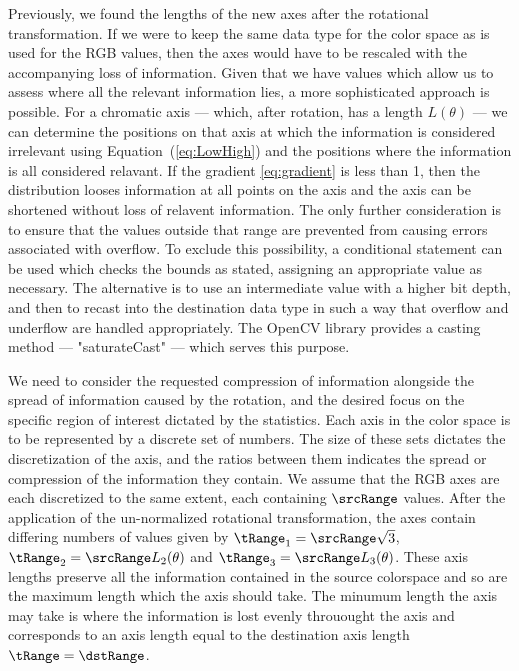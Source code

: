 Previously, we found the lengths of the new axes after the rotational transformation. If we were to keep the same data type for the color space as is used for the RGB values, then the axes would have to be rescaled with the accompanying loss of information. Given that we have values which allow us to assess where all the relevant information lies, a more sophisticated approach is possible. For a chromatic axis --- which, after rotation, has a length $L(\theta)$ --- we can determine the positions on that axis at which the information is considered irrelevant using Equation~(\ref{eq:LowHigh}) and the positions where the information is all considered relavant. If the gradient \ref{eq:gradient} is less than 1, then the distribution looses information at all points on the axis and the axis can be shortened without loss of relavent information. The only further consideration is to ensure that the values outside that range are prevented from causing errors associated with overflow. To exclude this possibility, a conditional statement can be used which checks the bounds as stated, assigning an appropriate value as necessary. The alternative is to use an intermediate value with a higher bit depth, and then to recast into the destination data type in such a way that overflow and underflow are handled appropriately. The OpenCV library provides a casting method --- "saturateCast" --- which serves this purpose.

We need to consider the requested compression of information alongside the spread of information caused by the rotation, and the desired focus on the specific region of interest dictated by the statistics. Each axis in the color space is to be represented by a discrete set of numbers. The size of these sets dictates the discretization of the axis, and the ratios between them indicates the spread or compression of the information they contain. We assume that the RGB axes are each discretized to the same extent, each containing $\srcRange$ values. After the application of the un-normalized rotational transformation, the axes contain differing numbers of values given by $\tRange_1 =\srcRange \sqrt{3} $, $\tRange_2 = \srcRange L_2(\theta) $  and $\tRange_3 = \srcRange L_3(\theta)$. These axis lengths preserve all the information contained in the source colorspace and so are the maximum length which the axis should take. The minumum length the axis may take is where the information is lost evenly throuought the axis and corresponds to an axis length equal to the destination axis length $\tRange = \dstRange$. 

